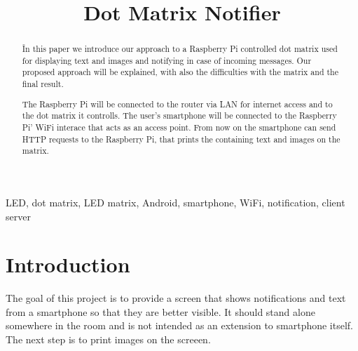 \documentclass[conference]{IEEEtran}
\begin{document}
\title{Dot Matrix Notifier}

\author{
\and
{}
\and
{}
}

\maketitle

\begin{abstract}
În this paper we introduce our approach to a Raspberry Pi controlled dot matrix used for displaying text and images and notifying in case of incoming messages. Our proposed approach will be explained, with also the difficulties with the matrix and the final result.

The Raspberry Pi will be connected to the router via LAN for internet access and to the dot matrix it controlls. The user's smartphone will be connected to the Raspberry Pi' WiFi interace that acts as an access point. From now on the smartphone can send HTTP requests to the Raspberry Pi, that prints the containing text and images on the matrix.
\end{abstract}

\begin{IEEEkeywords}
LED, dot matrix, LED matrix, Android, smartphone, WiFi, notification, client server
\end{IEEEkeywords}


\section{Introduction}
The goal of this project is to provide a screen that shows notifications and text from a smartphone so that they are better visible. It should stand alone somewhere in the room and is not intended as an extension to smartphone itself. The next step is to print images on the screeen.
\end{document}
